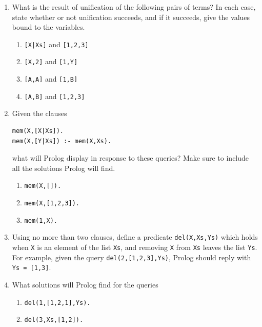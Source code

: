 \documentclass{article}
\begin{document}
\begin{enumerate}
\item
What is the result of unification of the following pairs of terms? In
each case, state whether or not unification succeeds, and if it
succeeds, give the values bound to the variables.  
\begin{enumerate}
\item
\verb![X|Xs]! and \verb![1,2,3]!
\item
\verb![X,2]! and \verb![1,Y]!
\item
\verb![A,A]! and \verb![1,B]!
\item
\verb![A,B]! and \verb![1,2,3]!
\end{enumerate}

\item
Given the clauses
\begin{verbatim}
mem(X,[X|Xs]).
mem(X,[Y|Xs]) :- mem(X,Xs).
\end{verbatim}
what will Prolog display in response to these queries? Make sure to
include all the solutions Prolog will find.
\begin{enumerate}
\item \verb!mem(X,[]).!
\item \verb!mem(X,[1,2,3]).!
\item \verb!mem(1,X).!
\end{enumerate}

\item
Using no more than two clauses, define a predicate \verb!del(X,Xs,Ys)!
which holds when \verb!X! is an element of the list \verb!Xs!, and
removing \verb!X! from \verb!Xs! leaves the list \verb!Ys!. For
example, given the query \verb!del(2,[1,2,3],Ys)!, Prolog should reply
with \verb!Ys = [1,3]!.

\item
What solutions will Prolog find for the queries
\begin{enumerate}
\item
\verb!del(1,[1,2,1],Ys).!
\item
\verb!del(3,Xs,[1,2]).!
\end{enumerate}


\end{enumerate}
\end{document}
